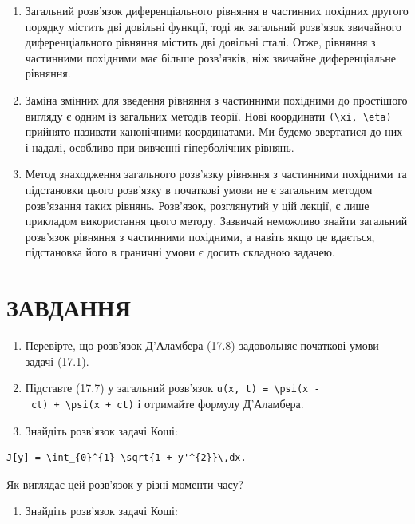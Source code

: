 \documentclass[
  ukrainian,
]{article}
\providecommand{\tightlist}{%
  \setlength{\itemsep}{0pt}\setlength{\parskip}{0pt}}
\begin{document}
\begin{enumerate}
\def\labelenumi{\arabic{enumi}.}
\item
  Загальний розв'язок диференціального рівняння в частинних похідних
  другого порядку містить дві довільні функції, тоді як загальний
  розв'язок звичайного диференціального рівняння містить дві довільні
  сталі. Отже, рівняння з частинними похідними має більше розв'язків,
  ніж звичайне диференціальне рівняння.
\item
  Заміна змінних для зведення рівняння з частинними похідними до
  простішого вигляду є одним із загальних методів теорії. Нові
  координати \texttt{(\textbackslash{}xi,\ \textbackslash{}eta)}
  прийнято називати канонічними координатами. Ми будемо звертатися до
  них і надалі, особливо при вивченні гіперболічних рівнянь.
\item
  Метод знаходження загального розв'язку рівняння з частинними похідними
  та підстановки цього розв'язку в початкові умови не є загальним
  методом розв'язання таких рівнянь. Розв'язок, розглянутий у цій
  лекції, є лише прикладом використання цього методу. Зазвичай неможливо
  знайти загальний розв'язок рівняння з частинними похідними, а навіть
  якщо це вдається, підстановка його в граничні умови є досить складною
  задачею.
\end{enumerate}

\section{ЗАВДАННЯ}\label{ux437ux430ux432ux434ux430ux43dux43dux44f-4}

\begin{enumerate}
\def\labelenumi{\arabic{enumi}.}
\item
  Перевірте, що розв'язок Д'Аламбера (17.8) задовольняє початкові умови
  задачі (17.1).
\item
  Підставте (17.7) у загальний розв'язок
  \texttt{u(x,\ t)\ =\ \textbackslash{}psi(x\ -\ ct)\ +\ \textbackslash{}psi(x\ +\ ct)}
  і отримайте формулу Д'Аламбера.
\item
  Знайдіть розв'язок задачі Коші:
\end{enumerate}

\begin{verbatim}
J[y] = \int_{0}^{1} \sqrt{1 + y'^{2}}\,dx.
\end{verbatim}

Як виглядає цей розв'язок у різні моменти часу?

\begin{enumerate}
\def\labelenumi{\arabic{enumi}.}
\setcounter{enumi}{3}
\tightlist
\item
  Знайдіть розв'язок задачі Коші:
\end{enumerate}
\end{document}
